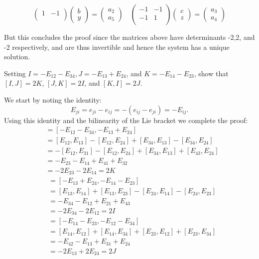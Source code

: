 \documentclass[12pt,onecolumn]{article}
\begin{document}
\begin{answer}
\[\begin{pmatrix}
1 & -1 \\
\end{pmatrix}
\begin{pmatrix}
b \\ y
\end{pmatrix} = 
\begin{pmatrix}
a_2 \\ a_5
\end{pmatrix}
\quad
\begin{pmatrix}
-1 & -1 \\
-1 & 1 \\
\end{pmatrix}
\begin{pmatrix}
c \\ z
\end{pmatrix} = 
\begin{pmatrix}
a_3 \\ a_4
\end{pmatrix}
\]
\end{answer}
But this concludes the proof since the matrices above have determinants -2,2, and -2 respectively, and are thus invertible and hence the system has a unique solution.
\begin{exercise}[6.5.5]
Setting $I =-E_{12}-E_{34}, J =-E_{13}+E_{24}$, and $K =-E_{14}-E_{23}$, show that $[I,J]=2K$, $[J,K]=2I$, and $[K,I]=2J$. 
\end{exercise}
\begin{answer}
We start by noting the identity:
\[
E_{ji} = e_{ji} - e_{ij} = -(e_{ij}-e_{ji}) = - E_{ij}.
\]
Using this identity and the bilinearity of the Lie bracket we complete the proof:
\begin{align*}
    [I,J] &= [-E_{12}-E_{34},-E_{13}+E_{24}]\\
    &= [E_{12},E_{13}] - [E_{12},E_{24}] + [E_{34},E_{13}]-[E_{34},E_{24}] \\
    &= -[E_{12},E_{31}] - [E_{12},E_{24}] + [E_{34},E_{13}] + [E_{43},E_{24}] \\
    &= -E_{23}-E_{14}+E_{41}+E_{32} \\
    &= -2E_{23}-2E_{14}= 2K
\end{align*}
\begin{align*}
    [J,K] &= [-E_{13}+E_{24},-E_{14}-E_{23}] \\
    &= [E_{13},E_{14} ] + [E_{13},E_{23}] - [E_{24},E_{14}] - [E_{24}, E_{23}] \\
    &= - E_{34} - E_{12} + E_{21} + E_{43}\\
    &= -2E_{34} - 2E_{12} = 2 I
\end{align*}
\begin{align*}
    [K,I] &= [-E_{14}-E_{23}, -E_{12}-E_{34}] \\
    &= [E_{14},E_{12} ]  + [E_{14}, E_{34}] + [E_{23}, E_{12}] + [E_{23}, E_{34}] \\
    &= -E_{42} - E_{13} + E_{31} + E_{24} \\
    &= -2E_{13} + 2 E_{24} = 2 J
\end{align*}
\end{answer}
\end{document}
